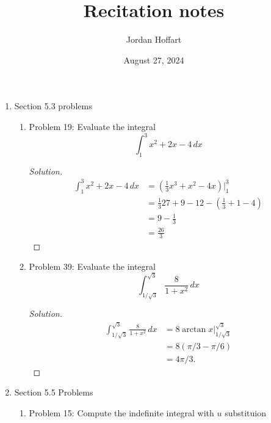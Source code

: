 \documentclass{article}
\title{Recitation notes}
\author{Jordan Hoffart}
\date{August 27, 2024}
\theoremstyle{plain}
\theoremstyle{definition}
\begin{document}
\maketitle
\begin{enumerate}
	\item Section 5.3 problems
	      \begin{enumerate}
		      \item Problem 19: Evaluate the integral
		            \begin{equation}
			            \int_1^3 x^2 + 2x - 4 \,dx
		            \end{equation}
		            \begin{proof}[Solution]
			            \begin{align}
				            \int_1^3 x^2 + 2x - 4 \,dx & = (\frac{1}{3}x^3 + x^2 - 4x)\bigg|_1^3          \\
				                                       & = \frac{1}{3}27 + 9 - 12 - (\frac{1}{3} + 1 - 4) \\
				                                       & = 9 - \frac{1}{3}                                \\
				                                       & = \frac{26}{3}
			            \end{align}
		            \end{proof}
		      \item Problem 39: Evaluate the integral
		            \begin{equation}
			            \int_{1/\sqrt{3}}^{\sqrt{3}} \frac{8}{1+x^2}\,dx
		            \end{equation}
		            \begin{proof}[Solution]
			            \begin{align}
				            \int_{1/\sqrt{3}}^{\sqrt{3}} \frac{8}{1+x^2}\,dx & = 8 \arctan x \bigg|_{1/\sqrt{3}}^{\sqrt{3}} \\
				                                                             & = 8 (\pi / 3 - \pi / 6)                      \\
				                                                             & = 4 \pi / 3.
			            \end{align}
		            \end{proof}
	      \end{enumerate}
	\item Section 5.5 Problems
	      \begin{enumerate}
		      \item Problem 15: Compute the indefinite integral with $u$ substituion

\end{enumerate}
\end{enumerate}
\end{document}
